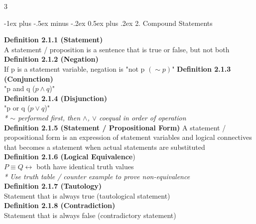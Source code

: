 \documentclass[10pt,landscape]{article}
\makeatletter
\renewcommand{\section}{\@startsection{section}{1}{0mm}%
    {-1ex plus -.5ex minus -.2ex}%
    {0.5ex plus .2ex}%
    {\normalfont\large\bfseries}}
\makeatother
\begin{document}
\begin{multicols}{3}
\begin{mdframed}
        \section{2. Compound Statements}
    \end{mdframed}
    \textbf{Definition 2.1.1 (Statement)} \\
    A statement / proposition is a sentence that is true or false, but not both \\
    \textbf{Definition 2.1.2 (Negation)} \\
    If p is a statement variable, negation is "not p $(\sim p)$"
    \textbf{Definition 2.1.3 (Conjunction)} \\
    "p and q ($p \land q$)" \\
    \textbf{Definition 2.1.4 (Disjunction)} \\
    "p or q ($p \lor q$)" \\
    \textit{* $\sim$ performed first, then $\land$, $\lor$ coequal in order of operation} \\
    \textbf{Definition 2.1.5 (Statement / Propositional Form)}
    A statement / propositional form is an expression of statement variables and logical connectives that becomes a statement when actual statements are substituted \\
    \textbf{Definition 2.1.6 (Logical Equivalence}) \\
    $P \equiv Q \leftrightarrow$ both have identical truth values \\
    \textit{* Use truth table / counter example to prove non-equivalence} \\
    \textbf{Definition 2.1.7 (Tautology)} \\
    Statement that is always true (tautological statement) \\
    \textbf{Definition 2.1.8 (Contradiction)} \\
    Statement that is always false (contradictory statement) \\

\end{multicols}
\end{document}
